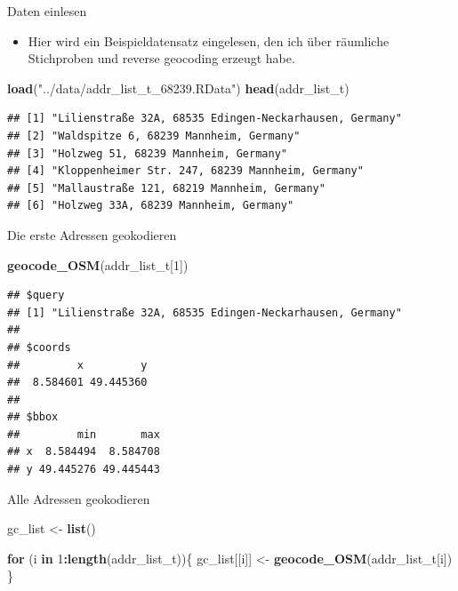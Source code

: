 \documentclass[ignorenonframetext,]{beamer}
\newenvironment{Shaded}{\begin{snugshade}}{\end{snugshade}}
\newcommand{\ControlFlowTok}[1]{\textcolor[rgb]{0.13,0.29,0.53}{\textbf{#1}}}
\newcommand{\DecValTok}[1]{\textcolor[rgb]{0.00,0.00,0.81}{#1}}
\newcommand{\KeywordTok}[1]{\textcolor[rgb]{0.13,0.29,0.53}{\textbf{#1}}}
\newcommand{\NormalTok}[1]{#1}
\newcommand{\OperatorTok}[1]{\textcolor[rgb]{0.81,0.36,0.00}{\textbf{#1}}}
\newcommand{\StringTok}[1]{\textcolor[rgb]{0.31,0.60,0.02}{#1}}
\providecommand{\tightlist}{%
  \setlength{\itemsep}{0pt}\setlength{\parskip}{0pt}}
\begin{document}
\begin{frame}[fragile]{Daten einlesen}
\protect\hypertarget{daten-einlesen}{}

\begin{itemize}
\tightlist
\item
  Hier wird ein Beispieldatensatz eingelesen, den ich über räumliche
  Stichproben und reverse geocoding erzeugt habe.
\end{itemize}

\begin{Shaded}
\begin{Highlighting}[]
\KeywordTok{load}\NormalTok{(}\StringTok{"../data/addr_list_t_68239.RData"}\NormalTok{)}
\KeywordTok{head}\NormalTok{(addr_list_t)}
\end{Highlighting}
\end{Shaded}

\begin{verbatim}
## [1] "Lilienstraße 32A, 68535 Edingen-Neckarhausen, Germany"
## [2] "Waldspitze 6, 68239 Mannheim, Germany"                
## [3] "Holzweg 51, 68239 Mannheim, Germany"                  
## [4] "Kloppenheimer Str. 247, 68239 Mannheim, Germany"      
## [5] "Mallaustraße 121, 68219 Mannheim, Germany"            
## [6] "Holzweg 33A, 68239 Mannheim, Germany"
\end{verbatim}

\end{frame}

\begin{frame}[fragile]{Die erste Adressen geokodieren}
\protect\hypertarget{die-erste-adressen-geokodieren}{}

\begin{Shaded}
\begin{Highlighting}[]
\KeywordTok{geocode_OSM}\NormalTok{(addr_list_t[}\DecValTok{1}\NormalTok{])}
\end{Highlighting}
\end{Shaded}

\begin{verbatim}
## $query
## [1] "Lilienstraße 32A, 68535 Edingen-Neckarhausen, Germany"
## 
## $coords
##         x         y 
##  8.584601 49.445360 
## 
## $bbox
##         min       max
## x  8.584494  8.584708
## y 49.445276 49.445443
\end{verbatim}

\end{frame}

\begin{frame}[fragile]{Alle Adressen geokodieren}
\protect\hypertarget{alle-adressen-geokodieren}{}

\begin{Shaded}
\begin{Highlighting}[]
\NormalTok{gc_list <-}\StringTok{ }\KeywordTok{list}\NormalTok{()}

\ControlFlowTok{for}\NormalTok{ (i }\ControlFlowTok{in} \DecValTok{1}\OperatorTok{:}\KeywordTok{length}\NormalTok{(addr_list_t))\{}
\NormalTok{  gc_list[[i]] <-}\StringTok{ }\KeywordTok{geocode_OSM}\NormalTok{(addr_list_t[i])}
\NormalTok{\}}
\end{Highlighting}
\end{Shaded}

\end{frame}
\end{document}
